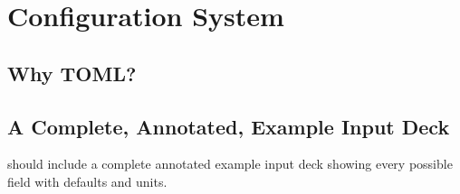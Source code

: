 \newpage
\section{Configuration System}

\subsection{Why TOML?}

\subsection{A Complete, Annotated, Example Input Deck}




should include a complete annotated example input deck
showing every possible field with defaults and units.
